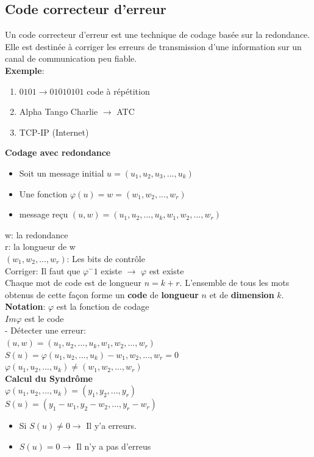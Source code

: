 \documentclass[12pt,openany]{report}
\begin{document}
\subsection{Code correcteur d'erreur}
Un code correcteur d'erreur est une technique de codage basée sur la redondance. Elle est destinée à corriger les erreurs de transmission d'une information sur un canal de communication peu fiable.\\
\textbf{Exemple}:
\begin{enumerate}
\item $0101 \rightarrow 01010101$ code à répétition
\item Alpha Tango Charlie $\rightarrow$ ATC
\item TCP-IP (Internet)
\end{enumerate}
\textbf{Codage avec redondance}
\begin{itemize}
\item Soit un message initial $u=(u_1,u_2,u_3,...,u_k)$
\item Une fonction $\varphi(u)=w=(w_1,w_2,...,w_r)$
\item message reçu $(u,w)=(u_1,u_2,...,u_k,w_1,w_2,...,w_r)$

\end{itemize}
w: la redondance\\
r: la longueur de w\\
$(w_1,w_2,...,w_r)$: Les bits de contrôle\\
Corriger: Il faut que $\varphi^-1$ existe $\rightarrow$ $\varphi$ est existe \\
Chaque mot de code est de longueur $n=k+r$. L'ensemble de tous les mots obtenus de cette façon forme un \textbf{code} de \textbf{longueur} $n$ et de \textbf{dimension} $k$.\\

\textbf{Notation}: $\varphi$ est la fonction de codage\\
                    $Im\varphi$ est le code\\
- Détecter une erreur:\\
$(u,w)=(u_1,u_2,...,u_k,w_1,w_2,...,w_r)$\\
$S(u)=\varphi(u_1,u_2,...,u_k)-w_1,w_2,...,w_r=0$ \\
$\varphi(u_1,u_2,...,u_k)\neq( w_1,w_2,...,w_r)$\\
\textbf{Calcul du Syndrôme}\\
$\varphi(u_1,u_2,...,u_k)=(y_1,y_2,...,y_r)$\\
$S(u)=(y_1-w_1,y_2-w_2,...,y_r-w_r)$
\begin{itemize}
\item Si $S(u)\neq 0 \rightarrow$ Il y'a erreurs.
\item $S(u)= 0 \rightarrow$ Il n'y a pas d'erreus
\end{itemize}
\end{document}
